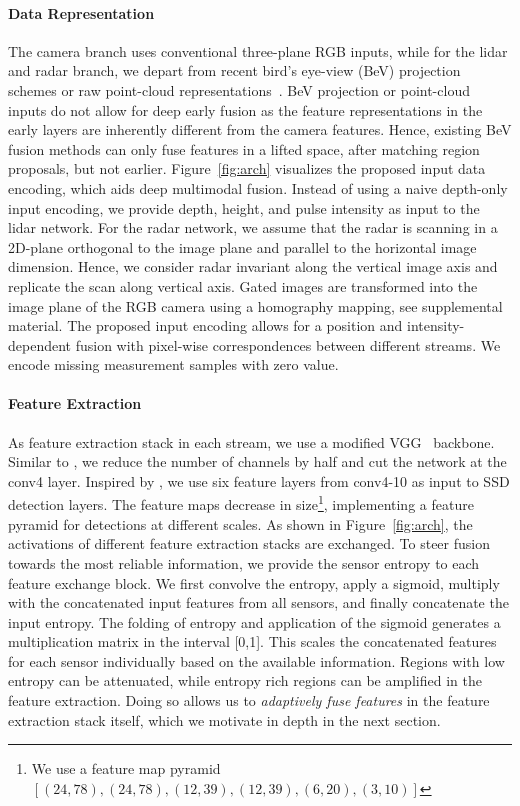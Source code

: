 \paragraph{Data Representation}\label{sec:datarep} The camera branch uses conventional three-plane RGB inputs, while for the lidar and radar branch, we depart from recent bird's eye-view (BeV) projection~\cite{ku2018joint} schemes or raw point-cloud representations~\cite{xu2017pointfusion}. BeV projection or point-cloud inputs do not allow for deep early fusion as the feature representations in the early layers are inherently different from the camera features. Hence, existing BeV fusion methods can only fuse features in a lifted space, after matching region proposals, but not earlier. Figure~\ref{fig:arch} visualizes the proposed input data encoding, which aids deep multimodal fusion. 
Instead of using a naive depth-only input encoding, we provide depth, height, and pulse intensity as input to the lidar network. 
For the radar network, we assume that the radar is scanning in a 2D-plane orthogonal to the image plane and parallel to the horizontal image dimension. Hence, we consider radar invariant along the vertical image axis and replicate the scan along vertical axis. Gated images are transformed into the image plane of the RGB camera using a homography mapping, see supplemental material. The proposed input encoding allows for a position and intensity-dependent fusion with pixel-wise correspondences between different streams. We encode missing measurement samples with zero value.

\vspace{-0.5em}
\paragraph{Feature Extraction} As feature extraction stack in each stream, we use a modified VGG~\cite{simonyan2014very} backbone. Similar to \cite{ku2018joint,chen2017multi}, we reduce the number of channels by half and cut the network at the conv4 layer. Inspired by \cite{SSDLiu2015,featurePyramid}, we use six feature layers from conv4-10 as input to SSD detection layers. The feature maps decrease in size\footnote{\tiny{We use a feature map pyramid $\left[(24, 78), (24, 78), (12, 39), (12, 39), (6, 20), (3, 10)\right]$}}, implementing a feature pyramid for detections at different scales. As shown in Figure~\ref{fig:arch}, the activations of different feature extraction stacks are exchanged. To steer fusion towards the most reliable information, we provide the sensor entropy to each feature exchange block. We first convolve the entropy, apply a sigmoid, multiply with the concatenated input features from all sensors, and finally concatenate the input entropy. The folding of entropy and application of the sigmoid generates a multiplication matrix in the interval [0,1]. This scales the concatenated features for each sensor individually based on the available information. Regions with low entropy can be attenuated, while entropy rich regions can be amplified in the feature extraction. Doing so allows us to \emph{adaptively fuse features} in the feature extraction stack itself, which we motivate in depth in the next section. 

